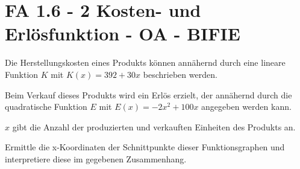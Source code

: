 \section{FA 1.6 - 2 Kosten- und Erlösfunktion - OA - BIFIE}

\begin{beispiel}[FA 1.6]{1} %
Die Herstellungskosten eines Produkts können annähernd durch eine lineare Funktion $K$ mit $K(x) = 392 + 30x$ beschrieben werden. \leer

Beim Verkauf dieses Produkts wird ein Erlös erzielt, der annähernd durch die quadratische Funktion $E$ mit $E(x) = -2x^2 + 100x$ angegeben werden kann.\leer

$x$ gibt die Anzahl der produzierten und verkauften Einheiten des Produkts an. \leer


Ermittle die x-Koordinaten der Schnittpunkte dieser Funktionsgraphen und interpretiere diese im gegebenen Zusammenhang.


\end{beispiel}